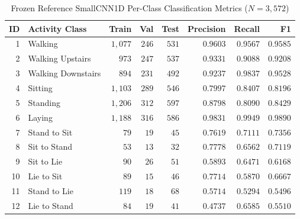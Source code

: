\documentclass[11pt,oneside,a4paper]{report}
\newcommand{\code}[1]{{\small\upshape\ttfamily #1}}
\theoremstyle{remark}
\begin{document}
\begin{table}[htbp]
\centering\small
\caption{Frozen Reference \code{SmallCNN1D} Per-Class Classification Metrics ($N = 3,572$)}
\label{tab:app_per_class}
\begin{tabularx}{\textwidth}{@{}rYrrrrrr@{}}
\toprule
\textbf{ID} & \textbf{Activity Class} & \textbf{Train} & \textbf{Val} & \textbf{Test} & \textbf{Precision} & \textbf{Recall} & \textbf{F1} \\
 & Walking & $1,077$ & $246$ & $531$ & $0.9603$ & $0.9567$ & $0.9585$ \\
2 & Walking Upstairs & $973$ & $247$ & $537$ & $0.9331$ & $0.9088$ & $0.9208$ \\
3 & Walking Downstairs & $894$ & $231$ & $492$ & $0.9237$ & $0.9837$ & $0.9528$ \\
4 & Sitting & $1,103$ & $289$ & $546$ & $0.7997$ & $0.8407$ & $0.8196$ \\
5 & Standing & $1,206$ & $312$ & $597$ & $0.8798$ & $0.8090$ & $0.8429$ \\
6 & Laying & $1,188$ & $316$ & $586$ & $0.9831$ & $0.9949$ & $0.9890$ \\
7 & Stand to Sit & $79$ & $19$ & $45$ & $0.7619$ & $0.7111$ & $0.7356$ \\
8 & Sit to Stand & $53$ & $13$ & $32$ & $0.7778$ & $0.6562$ & $0.7119$ \\
9 & Sit to Lie & $90$ & $26$ & $51$ & $0.5893$ & $0.6471$ & $0.6168$ \\
10 & Lie to Sit & $89$ & $15$ & $46$ & $0.7714$ & $0.5870$ & $0.6667$ \\
11 & Stand to Lie & $119$ & $18$ & $68$ & $0.5714$ & $0.5294$ & $0.5496$ \\
12 & Lie to Stand & $84$ & $19$ & $41$ & $0.4737$ & $0.6585$ & $0.5510$ \\
\bottomrule
\end{tabularx}
\end{table}
\end{document}
